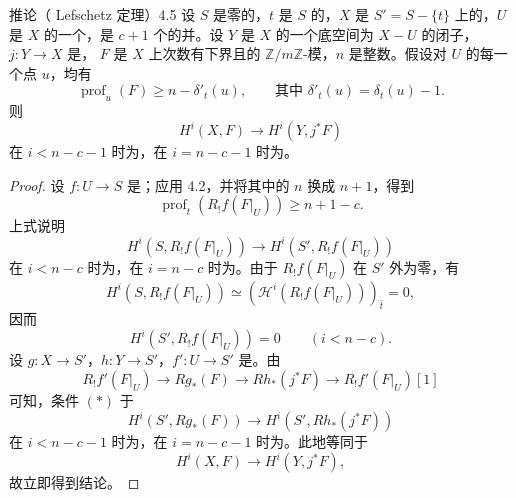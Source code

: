 \begin{SGAresult}{推论（ Lefschetz 定理）}{4.5}
设 $S$ 是零的，$t$ 是 $S$ 的，$X$ 是 $S'=S-\{t\}$ 上的，$U$ 是 $X$ 的一个，是 $c+1$ 个的并。设 $Y$ 是 $X$ 的一个底空间为 $X-U$ 的闭子，$j:Y\to X$ 是，
$F$ 是 $X$ 上次数有下界且的 $\mathbb Z/m\mathbb Z$-模，$n$ 是整数。假设对 $U$ 的每一个点 $u$，均有
\[
\operatorname{prof}_u(F)\geq n-\delta'_t(u),\qquad
\text{其中 }\delta'_t(u)=\delta_t(u)-1.
\]
则
\[
H^i(X,F)\longrightarrow H^i(Y,j^*F)
\]
在 $i<n-c-1$ 时为，在 $i=n-c-1$ 时为。
\end{SGAresult}
\begin{proof}
设 $f:U\to S$ 是；应用 4.2，并将其中的 $n$ 换成 $n+1$，得到
\[
\operatorname{prof}_t(R_!f(F|_U))\geq n+1-c.
\]
上式说明
\[
H^i(S,R_!f(F|_U))\longrightarrow H^i(S',R_!f(F|_U))
\]
在 $i<n-c$ 时为，在 $i=n-c$ 时为。由于 $R_!f(F|_U)$ 在 $S'$ 外为零，有
\[
H^i(S,R_!f(F|_U))\simeq(\mathcal H^i(R_!f(F|_U)))_{\bar t}=0,
\]
因而
\[
H^i(S',R_!f(F|_U))=0\qquad(i<n-c).\tag{*}
\]
设 $g:X\to S'$，$h:Y\to S'$，$f':U\to S'$ 是。由
\[
R_!f'(F|_U)\longrightarrow Rg_*(F)\longrightarrow Rh_*(j^*F)
\longrightarrow R_!f'(F|_U)[1]
\]
可知，条件 $(*)$ 于
\[
H^i(S',Rg_*(F))\longrightarrow H^i(S',Rh_*(j^*F))
\]
在 $i<n-c-1$ 时为，在 $i=n-c-1$ 时为。此地等同于
\[
H^i(X,F)\longrightarrow H^i(Y,j^*F),
\]
故立即得到结论。
\end{proof}

